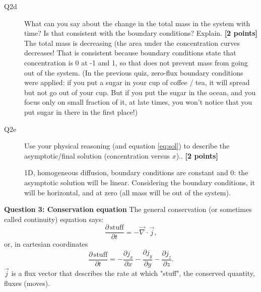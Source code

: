 \documentclass{article}
\newcommand{\ans}[1]{\textcolor{dark-green}{#1}}
\begin{document}
\begin{description}
\item [Q2d] What can you say about the change in the total mass in the system with time? Is that consistent with the boundary conditions? Explain. \textbf{[2 points]}
\ans{The total mass is decreasing (the area under the concentration curves decreases! That is consistent because boundary conditions state that concentration is 0 at -1 and 1, so that does not prevent mass from going out of the system. (\small{In the previous quiz, zero-flux boundary conditions were applied: if you put a sugar in your cup of coffee / tea, it will spread but not go out of your cup. But if you put the sugar in the ocean, and you focus only on small fraction of it, at late times, you won't notice that you put sugar in there in the first place!})}

\item [Q2e] Use your physical reasoning (and equation \ref{eq:sol}) to describe the asymptotic/final solution (concentration versus $x$).. \textbf{[2 points]}

\ans{1D, homogeneous diffusion, boundary conditions are constant and 0: the asymptotic solution will be linear. Considering the boundary conditions, it will be horizontal, and at zero (all mass will be out of the system).}

\end{description}

\textbf{Question 3: Conservation equation}
The general conservation (or sometimes called continuity) equation says:
\begin{equation}
\frac{\partial \, \mathrm{stuff}}{\partial t} = - \overrightarrow{\nabla } \cdot\overrightarrow{j},
\end{equation} or, in cartesian coordinates
\begin{equation}
\frac{\partial \, \mathrm{stuff}}{\partial t} = - \frac{\partial j_x}{\partial x} - \frac{\partial j_y}{\partial y} - \frac{\partial j_z}{\partial z}.
\end{equation} $ \overrightarrow{j} $ is a flux vector that describes the rate at which "stuff", the conserved quantity, fluxes (moves).
\end{document}

